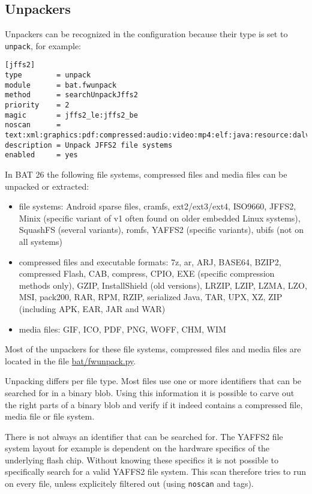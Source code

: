\documentclass[10pt,a4paper]{article}
\begin{document}
\subsection{Unpackers}

Unpackers can be recognized in the configuration because their type is set
to \texttt{unpack}, for example:

\begin{verbatim}
[jffs2]
type        = unpack
module      = bat.fwunpack
method      = searchUnpackJffs2
priority    = 2
magic       = jffs2_le:jffs2_be
noscan      = text:xml:graphics:pdf:compressed:audio:video:mp4:elf:java:resource:dalvik
description = Unpack JFFS2 file systems
enabled     = yes
\end{verbatim}

In BAT 26 the following file systems, compressed files and media files can be
unpacked or extracted:

\begin{itemize}
\item file systems: Android sparse files, cramfs, ext2/ext3/ext4, ISO9660,
JFFS2, Minix (specific variant of v1 often found on older embedded Linux
systems), SquashFS (several variants), romfs, YAFFS2 (specific variants),
ubifs (not on all systems)
\item compressed files and executable formats: 7z, ar, ARJ, BASE64, BZIP2,
compressed Flash, CAB, compress, CPIO, EXE (specific compression methods only),
GZIP, InstallShield (old versions), LRZIP, LZIP, LZMA, LZO, MSI, pack200, RAR,
RPM, RZIP, serialized Java, TAR, UPX, XZ, ZIP (including APK, EAR, JAR and WAR)
\item media files: GIF, ICO, PDF, PNG, WOFF, CHM, WIM
\end{itemize}

Most of the unpackers for these file systems, compressed files and media files
are located in the file \url{bat/fwunpack.py}.

Unpacking differs per file type. Most files use one or more identifiers that
can be searched for in a binary blob. Using this information it is possible
to carve out the right parts of a binary blob and verify if it indeed contains
a compressed file, media file or file system.

There is not always an identifier that can be searched for. The YAFFS2 file
system layout for example is dependent on the hardware specifics of the
underlying flash chip. Without knowing these specifics it is not possible to
specifically search for a valid YAFFS2 file system. This scan therefore tries
to run on every file, unless explicitely filtered out (using \texttt{noscan}
and tags).
\end{document}
